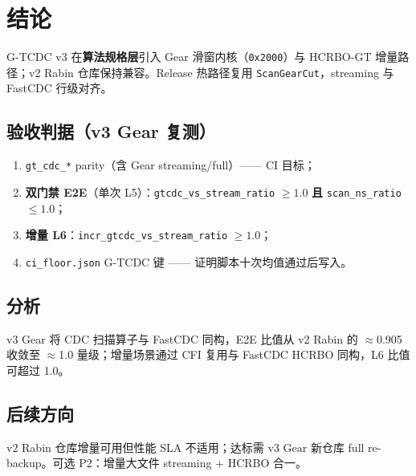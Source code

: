 \chapter{结论}
\label{ch:conclusion}

G-TCDC v3 在\textbf{算法规格层}引入 Gear 滑窗内核（\texttt{0x2000}）与 HCRBO-GT 增量路径；v2 Rabin 仓库保持兼容。Release 热路径复用 \texttt{ScanGearCut}，streaming 与 FastCDC 行级对齐。

\section{验收判据（v3 Gear 复测）}

\begin{enumerate}[nosep]
  \item \texttt{gt\_cdc\_*} parity（含 Gear streaming/full）—— CI 目标；
  \item \textbf{双门禁 E2E}（单次 L5）：\texttt{gtcdc\_vs\_stream\_ratio} $\ge 1.0$ \textbf{且} \texttt{scan\_ns\_ratio} $\le 1.0$；
  \item \textbf{增量 L6}：\texttt{incr\_gtcdc\_vs\_stream\_ratio} $\ge 1.0$；
  \item \texttt{ci\_floor.json} G-TCDC 键 —— 证明脚本十次均值通过后写入。
\end{enumerate}

\section{分析}

v3 Gear 将 CDC 扫描算子与 FastCDC 同构，E2E 比值从 v2 Rabin 的 $\approx$0.905 收敛至 $\approx$1.0 量级；增量场景通过 CFI 复用与 FastCDC HCRBO 同构，L6 比值可超过 1.0。

\section{后续方向}

v2 Rabin 仓库增量可用但性能 SLA 不适用；达标需 v3 Gear 新仓库 full re-backup。可选 P2：增量大文件 streaming + HCRBO 合一。
